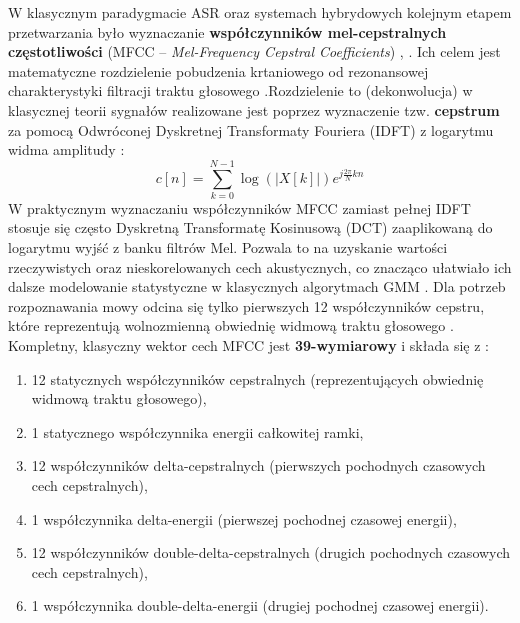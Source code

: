 W klasycznym paradygmacie ASR oraz systemach hybrydowych kolejnym etapem przetwarzania było wyznaczanie \textbf{współczynników mel-cepstralnych częstotliwości} (MFCC -- \textit{Mel-Frequency Cepstral Coefficients}) \cite[s.~352--354]{jurafsky2026}, \cite[s.~315]{pondel2024e2e}. Ich celem jest matematyczne rozdzielenie pobudzenia krtaniowego od rezonansowej charakterystyki filtracji traktu głosowego \cite[s.~352--353]{jurafsky2026}.Rozdzielenie to (dekonwolucja) w klasycznej teorii sygnałów realizowane jest poprzez wyznaczenie tzw. \textbf{cepstrum} za pomocą Odwróconej Dyskretnej Transformaty Fouriera (IDFT) z logarytmu widma amplitudy \cite[s.~353--354]{jurafsky2026}:
\begin{equation}
    c[n] = \sum_{k=0}^{N-1} \log(|X[k]|) e^{j \frac{2\pi}{N} kn}
\end{equation}
W praktycznym wyznaczaniu współczynników MFCC zamiast pełnej IDFT stosuje się często Dyskretną Transformatę Kosinusową (DCT) zaaplikowaną do logarytmu wyjść z banku filtrów Mel. Pozwala to na uzyskanie wartości rzeczywistych oraz nieskorelowanych cech akustycznych, co znacząco ułatwiało ich dalsze modelowanie statystyczne w klasycznych algorytmach GMM \cite[s.~354]{jurafsky2026}. Dla potrzeb rozpoznawania mowy odcina się tylko pierwszych 12 współczynników cepstru, które reprezentują wolnozmienną obwiednię widmową traktu głosowego \cite[s.~354]{jurafsky2026}. Kompletny, klasyczny wektor cech MFCC jest \textbf{39-wymiarowy} i składa się z \cite[s.~352]{jurafsky2026}:
\begin{enumerate}
\item 12 statycznych współczynników cepstralnych (reprezentujących obwiednię widmową traktu głosowego),

\item 1 statycznego współczynnika energii całkowitej ramki,

\item 12 współczynników delta-cepstralnych (pierwszych pochodnych czasowych cech cepstralnych),

\item 1 współczynnika delta-energii (pierwszej pochodnej czasowej energii),

\item 12 współczynników double-delta-cepstralnych (drugich pochodnych czasowych cech cepstralnych),

\item 1 współczynnika double-delta-energii (drugiej pochodnej czasowej energii).
\end{enumerate}
